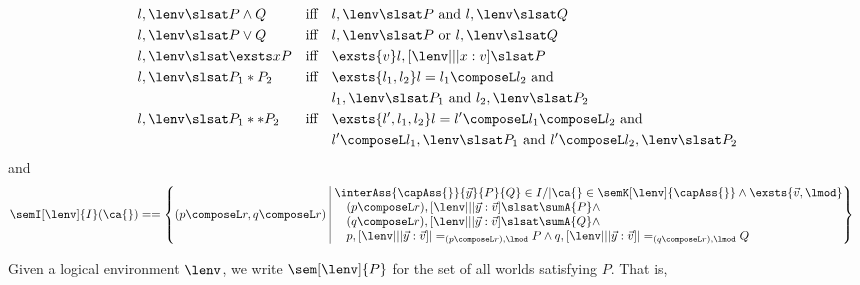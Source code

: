 \begin{definition}
\begin{align*}
%
%  
%
% 
  l, \lenv & \slsat P \land Q
  &&\text{iff}&& l, \lenv \slsat P\text{ and } l, \lenv \slsat Q\\
%
  l, \lenv & \slsat P \lor Q
  &&\text{iff}&& l, \lenv \slsat P\text{ or } l, \lenv \slsat Q\\
%
  l, \lenv & \slsat \exsts x P
  &&\text{iff}&& \exsts{v} l, [\lenv|||x:v] \slsat P\\
%  
  l, \lenv &\slsat P_1 * P_2 &&\text{iff}&&
  \exsts{l_1, l_2} l = l_1 \composeL l_2 \text{ and}\\
  &&&&& l_1, \lenv \slsat P_1 \text{ and } l_2, \lenv \slsat P_2\\
%  
%  
  l, \lenv &\slsat P_1 ** P_2 &&\text{iff}&&
  \exsts{l', l_1, l_2} l = l' \composeL l_1 \composeL l_2\text{ and}\\
  &&&&&
  l' \composeL l_1, \lenv \slsat P_1 \text{ and }
  l' \composeL l_2, \lenv \slsat P_2
%  
%  
\end{align*}
%
and
\begin{align*}
  \semI[\lenv]{I}(\ca{}) &==
  \left\{
  \begin{array}{@{}l@{\ }|@{\ }r@{}}
    (p \composeL r, q \composeL r)&
    \begin{array}{@{}l@{}}
      \interAss{\capAss{}}{\vec{y}}{P}{Q} \in I /| \ca{} \in \semK[\lenv]{\capAss{}}\land
      \exsts{\vec{v}, \lmod}\\
      \quad (p \composeL r), [\lenv|||\vec y:\vec v] \slsat \sumA{P} \land\\
      \quad (q \composeL r), [\lenv|||\vec y:\vec v] \slsat \sumA{Q} \land \\
      \quad p, [\lenv|||\vec y:\vec v] |=_{(p \composeL r), \lmod} P \land
      q, [\lenv|||\vec y:\vec v] |=_{(q \composeL r), \lmod} Q 
    \end{array}
  \end{array}
  \right\}
  \end{align*}
\end{definition}
%
\noindent Given a logical environment $\lenv$, we write $\sem[\lenv]{P}$ for the set of all worlds satisfying $P$. That is, 

